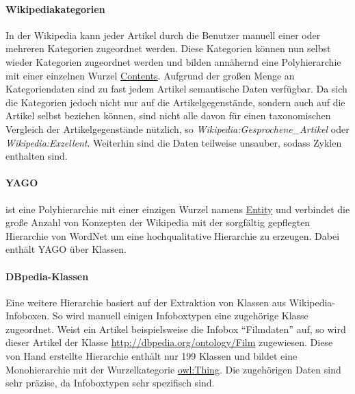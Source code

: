 \paragraph{Wikipediakategorien}%
In der Wikipedia kann jeder Artikel durch die Benutzer manuell einer oder mehreren Kategorien zugeordnet werden.
Diese Kategorien können nun selbst wieder Kategorien zugeordnet werden und bilden annähernd eine Polyhierarchie mit einer einzelnen Wurzel \url{Contents}.
Aufgrund der großen Menge an Kategoriendaten\footnotemark{} sind zu fast jedem Artikel semantische Daten verfügbar.
Da sich die Kategorien jedoch nicht nur auf die Artikelgegenstände, sondern auch auf die Artikel selbst beziehen können, sind nicht alle davon für einen
taxonomischen Vergleich der Artikelgegenstände nützlich, so \zb{} \emph{Wikipedia:Gesprochene\_Artikel} oder \emph{Wikipedia:Exzellent}.
Weiterhin sind die Daten teilweise unsauber, sodass Zyklen enthalten sind.

\paragraph{YAGO}
\citep[beschrieben in][]{yago} ist eine Polyhierarchie mit einer einzigen Wurzel namens \url{Entity} und verbindet die große Anzahl von Konzepten der Wikipedia mit der sorgfältig gepflegten Hierarchie von WordNet \citep{wordnet} um eine hochqualitative Hierarchie zu erzeugen.
Dabei enthält YAGO über  Klassen.%
\paragraph{DBpedia-Klassen}%
Eine weitere Hierarchie basiert auf der Extraktion von Klassen aus Wikipedia-Infoboxen.
So wird manuell einigen Infoboxtypen eine zugehörige Klasse zugeordnet.
Weist ein Artikel beispielsweise die Infobox "`Filmdaten"' auf, so wird dieser Artikel der Klasse \url{http://dbpedia.org/ontology/Film} zugewiesen.
Diese von Hand erstellte Hierarchie enthält nur 199 Klassen und bildet eine Monohierarchie mit der Wurzelkategorie \url{owl:Thing}. Die zugehörigen Daten sind sehr präzise, da Infoboxtypen sehr spezifisch sind.
 
